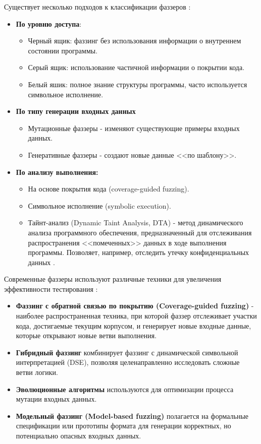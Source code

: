 Существует несколько подходов к классификации фаззеров \cite{Kuliamin}\cite{Boehme}:
\begin{itemize}
	\item \textbf{По уровню доступа}:
	\begin{itemize}
		\item Черный ящик: фаззинг без использования информации о внутреннем состоянии программы.
		\item Серый ящик: использование частичной информации о покрытии кода.
		\item Белый яшик: полное знание структуры программы, часто используется символьное исполнение.
	\end{itemize}
	\item \textbf{По типу генерации входных данных}
	\begin{itemize}
		\item Мутационные фаззеры - изменяют существующие примеры входных данных.
		\item Генеративные фаззеры - создают новые данные <<по шаблону>>.
	\end{itemize}
	\item \textbf{По анализу выполнения:}
	\begin{itemize}
		\item На основе покрытия кода (coverage-guided fuzzing).
		\item Символьное исполнение (symbolic execution).
		\item Тайнт-анализ (Dynamic Taint Analysis, DTA) - метод динамического анализа программного обеспечения, предназначенный для отслеживания распространения <<помеченных>> данных в ходе выполнения программы. Позволяет, например, отследить утечку конфиденциальных данных \cite{Kuliamin}.
	\end{itemize}
\end{itemize}

Современные фаззеры используют различные техники для увеличения эффективности тестирования \cite{Kuliamin}\cite{Boehme}:
\begin{itemize}
	\item \textbf{Фаззинг с обратной связью по покрытию (Coverage-guided fuzzing)} - наиболее распространенная техника, при которой фаззер отслеживает участки кода, достигаемые текущим корпусом, и генерирует новые входные данные, которые открывают новые ветви выполнения.
	\item \textbf{Гибридный фаззинг}  комбинирует фаззинг с динамической символьной интерпретацией (DSE), позволяя целенаправленно исследовать сложные ветви логики.
	\item \textbf{Эволюционные алгоритмы} используются для оптимизации процесса мутации входных данных.
	\item \textbf{Модельный фаззинг (Model-based fuzzing)} полагается на формальные спецификации или прототипы формата для генерации корректных, но потенциально опасных входных данных.
\end{itemize}

